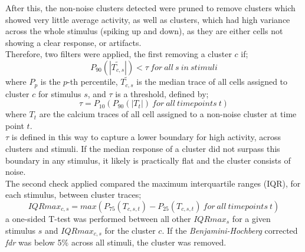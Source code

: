 \documentclass[12pt, a4paper, oneside]{article}
\begin{document}
After this, the non-noise clusters detected were pruned to remove clusters which showed very little average activity, as well as clusters, which had high variance across the whole stimulus (spiking up and down), as they are either cells not showing a clear response, or artifacts.\\
Therefore, two filters were applied, the first removing a cluster $c$ if;
\[
P_{90}( |\widetilde{T_{c,s}}| ) < \tau \ for \ all \ s \ in \ stimuli
\]
where $P_p$ is the $p$-th percentile, $\widetilde{T_{c,s}}$ is the median trace of all cells assigned to cluster $c$ for stimulus $s$, and $\tau$ is a threshold, defined by;
\[
\tau = P_{10}(P_{90}(|T_{t}|)\ for\ all\ time points\ t)
\]
where $T_{t}$ are the calcium traces of all cell assigned to a non-noise cluster at time point $t$.\\
$\tau$ is defined in this way to capture a lower boundary for high activity, across clusters and stimuli. If the median response of a cluster did not surpass this boundary in any stimulus, it likely is practically flat and the cluster consists of noise.\\

The second check applied compared the maximum interquartile ranges (IQR), for each stimulus, between cluster traces;
\[
IQRmax_{c,s} = max(P_{75}(T_{c,s,t})-P_{25}(T_{c,s,t})\ for\ all\ time points\ t)
\]
a one-sided T-test was performed between all other $IQRmax_s$ for a given stimulus $s$ and  $IQRmax_{c,s}$ for the cluster $c$. If the \textit{Benjamini-Hochberg} corrected \textit{fdr} was below 5$\%$ across all stimuli, the cluster was removed.\\
\end{document}
